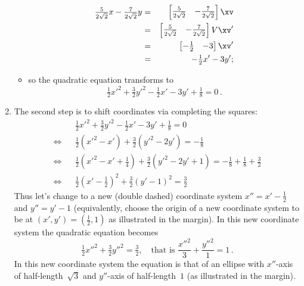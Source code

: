 \begin{example}
\begin{solution}
\begin{enumerate}
\begin{itemize}
\begin{eqnarray*}
\tfrac5{2\sqrt2}x-\tfrac7{2\sqrt2}y
&=&\begin{bmatrix} \tfrac5{2\sqrt2}&-\tfrac7{2\sqrt2} \end{bmatrix}\xv
\\&=&\begin{bmatrix} \tfrac5{2\sqrt2}&-\tfrac7{2\sqrt2} \end{bmatrix}V\xv'
\\&=&\begin{bmatrix} -\tfrac12&-3 \end{bmatrix}\xv'
\\&=&-\tfrac12x'-3y';
\end{eqnarray*}
\item so the quadratic equation transforms to
\begin{equation*}
\tfrac12{x'}^2+\tfrac32{y'}^2-\tfrac12x'-3y'+\tfrac18=0\,.
\end{equation*}
\end{itemize}

\item The second step is to shift coordinates via completing the squares:
\begin{eqnarray*}
&&\tfrac12{x'}^2+\tfrac32{y'}^2-\tfrac12x'-3y'+\tfrac18=0
\\\iff&&
\tfrac12({x'}^2-x')+\tfrac32({y'}^2-2y')=-\tfrac18
\\\iff&&
\tfrac12({x'}^2-x'+\tfrac14)+\tfrac32({y'}^2-2y'+1)=-\tfrac18+\tfrac18+\tfrac32
\\\iff&&
\tfrac12(x'-\tfrac12)^2+\tfrac32(y'-1)^2=\tfrac32
\end{eqnarray*}
%
Thus let's change to a new (double dashed) coordinate system \(x''=x'-\tfrac12\) and \(y''=y'-1\) (equivalently, choose the origin of a new coordinate system to be at \((x',y')=(\tfrac12,1)\) as illustrated in the margin).
In this new coordinate system the quadratic equation becomes
\begin{equation*}
\tfrac12{x''}^2+\tfrac32{y''}^2=\tfrac32,
\quad\text{that is } \frac{{x''}^2}3+\frac{{y''}^2}1=1\,.
\end{equation*}
%
In this new coordinate system the equation is that of an ellipse with \(x''\)-axis of half-length~\(\sqrt3\) and \(y''\)-axis of half-length~\(1\) (as illustrated in the margin).
\end{enumerate}
\end{solution}
\end{example}




